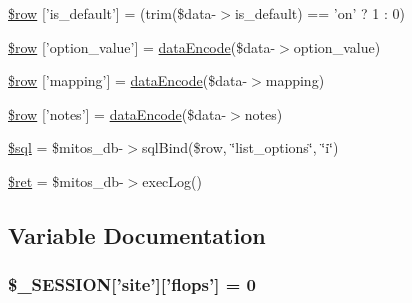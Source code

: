 \begin{DoxyCompactItemize}
\item 
\hyperlink{administration_2lists_2data__create_8ejs_8php_afb2c758deaface994a3fbc212ded12cd}{\$row} \mbox{[}'is\-\_\-default'\mbox{]} = (trim(\$data-\/$>$is\-\_\-default) == 'on' ? 1 \-: 0)
\item 
\hyperlink{administration_2lists_2data__create_8ejs_8php_a48eb30eb1a910d28f11f62cf48b97401}{\$row} \mbox{[}'option\-\_\-value'\mbox{]} = \hyperlink{data_exchange_8class_8php_a18220e6e744fcb46d788ed8b03b85f62}{data\-Encode}(\$data-\/$>$option\-\_\-value)
\item 
\hyperlink{administration_2lists_2data__create_8ejs_8php_ad4c649a633b36e8ca62f63391a3279a6}{\$row} \mbox{[}'mapping'\mbox{]} = \hyperlink{data_exchange_8class_8php_a18220e6e744fcb46d788ed8b03b85f62}{data\-Encode}(\$data-\/$>$mapping)
\item 
\hyperlink{administration_2lists_2data__create_8ejs_8php_a6cd140f95df717cfed217fe478482645}{\$row} \mbox{[}'notes'\mbox{]} = \hyperlink{data_exchange_8class_8php_a18220e6e744fcb46d788ed8b03b85f62}{data\-Encode}(\$data-\/$>$notes)
\item 
\hyperlink{administration_2lists_2data__create_8ejs_8php_a047170d6020a882807665812a27e2525}{\$sql} = \$mitos\-\_\-db-\/$>$sql\-Bind(\$row, \char`\"{}list\-\_\-options\char`\"{}, \char`\"{}i\char`\"{})
\item 
\hyperlink{administration_2lists_2data__create_8ejs_8php_affd9e3eb0aad0a7ca42912cd925f148c}{\$ret} = \$mitos\-\_\-db-\/$>$exec\-Log()
\end{DoxyCompactItemize}


\subsection{\-Variable \-Documentation}
\hypertarget{administration_2lists_2data__create_8ejs_8php_a99fda8552a3e58235643b79f5af3ded8}{
\subsubsection[{\$\-\_\-\-S\-E\-S\-S\-I\-O\-N}]{\setlength{\rightskip}{0pt plus 5cm}\$\-\_\-\-S\-E\-S\-S\-I\-O\-N\mbox{[}'site'\mbox{]}\mbox{[}'flops'\mbox{]} = 0}}\label{administration_2lists_2data__create_8ejs_8php_a99fda8552a3e58235643b79f5af3ded8}


